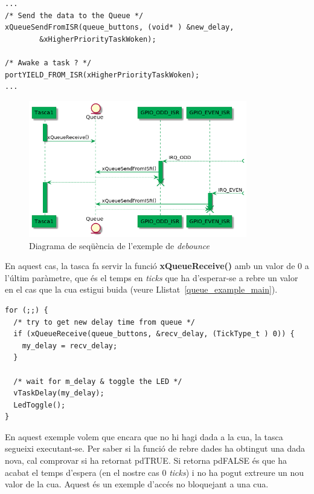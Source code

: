 \begin{lstlisting}[style=customc, label=Queue_example_ISR, caption=Part del codi d'una de les ISRs]
...
/* Send the data to the Queue */
xQueueSendFromISR(queue_buttons, (void* ) &new_delay,
		&xHigherPriorityTaskWoken);

/* Awake a task ? */
portYIELD_FROM_ISR(xHigherPriorityTaskWoken);
...
\end{lstlisting}


\begin{figure}
 \centering
 \includegraphics[width=0.85\textwidth, keepaspectratio]{imatges/QueueFreeRTOS.png}
 \caption{Diagrama de seqüència de l'exemple de {\em debounce}}
 \label{fig:SeqDiagramQueue}
\end{figure}

En aquest cas, la tasca fa servir la funció {\bf xQueueReceive()} amb un valor de 0 a l'últim paràmetre, que és el temps en {\em ticks} que ha d'esperar-se a rebre un valor en el cas que la cua estigui buida (veure Llistat~\ref{queue_example_main}).

\begin{lstlisting}[style=customc,label=queue_example_main, caption=Part principal de la tasca TaskLedToggle]
for (;;) {
  /* try to get new delay time from queue */
  if (xQueueReceive(queue_buttons, &recv_delay, (TickType_t ) 0)) {
    my_delay = recv_delay;
  }

  /* wait for m_delay & toggle the LED */
  vTaskDelay(my_delay);
  LedToggle();
}
\end{lstlisting}

En aquest exemple volem que encara que no hi hagi dada a la cua, la tasca segueixi executant-se. Per saber si la funció de rebre dades ha obtingut una dada nova, cal comprovar si ha retornat \gls{pdTRUE}. Si retorna \gls{pdFALSE} és que ha acabat el temps d'espera (en el nostre cas 0 {\em ticks}) i no ha pogut extreure un nou valor de la cua. Aquest és un exemple d'accés no bloquejant a una cua.

